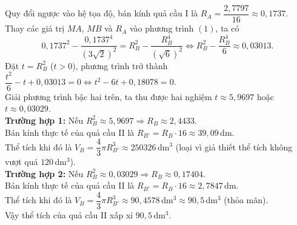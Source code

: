 \begin{ex}
{		Quy đổi ngược vào hệ tọa độ, bán kính quả cầu I là $R_A = \dfrac{2{,}7797}{16} \approx 0{,}1737$.\\
		Thay các giá trị $MA$, $MB$ và $R_A$ vào phương trình $(1)$, ta có \[0{,}1737^2 - \dfrac{0{,}1737^4}{\left(3\sqrt{2}\right)^2} = R_B^2 - \dfrac{R_B^4}{\left(\sqrt{6}\right)^2} \Leftrightarrow R_B^2 - \dfrac{R_B^4}{6} \approx 0{,}03013.\]
		Đặt $t = R_B^2$ ($t > 0$), phương trình trở thành $\dfrac{t^2}{6} - t + 0{,}03013 = 0 \Leftrightarrow t^2 - 6t + 0{,}18078 = 0$.\\
		Giải phương trình bậc hai trên, ta thu được hai nghiệm $t \approx 5{,}9697$ hoặc $t \approx 0{,}03029$.\\
		\textbf{Trường hợp 1:} Nếu $R_B^2 \approx 5{,}9697 \Rightarrow R_B \approx 2{,}4433$.\\ Bán kính thực tế của quả cầu II là $R_{B'} = R_B \cdot 16 \approx 39{,}09$\,dm.\\ Thể tích khi đó là $V_B = \dfrac{4}{3}\pi R_{B'}^3 \approx 250326$\,dm$^3$ (loại vì giả thiết thể tích không vượt quá $120$\,dm$^3$).\\
		\textbf{Trường hợp 2:} Nếu $R_B^2 \approx 0{,}03029 \Rightarrow R_B \approx 0{,}17404$.\\ Bán kính thực tế của quả cầu II là $R_{B'} = R_B \cdot 16 \approx 2{,}7847$\,dm.\\ Thể tích khi đó là $V_B = \dfrac{4}{3}\pi R_{B'}^3 \approx 90{,}4578$\,dm$^3 \approx 90{,}5$\,dm$^3$ (thỏa mãn).\\
		Vậy thể tích của quả cầu II xấp xỉ $90{,}5$\,dm$^3$.
	}
\end{ex}

